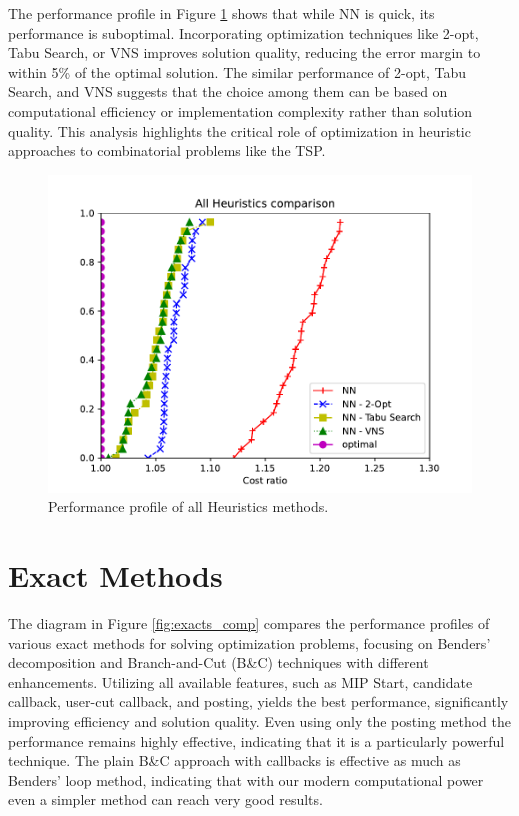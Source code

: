 The performance profile in Figure \ref{fig:heur_comp} shows that while NN is quick, its performance is suboptimal. Incorporating optimization techniques like 2-opt, Tabu Search, or VNS improves solution quality, reducing the error margin to within 5\% of the optimal solution. The similar performance of 2-opt, Tabu Search, and VNS suggests that the choice among them can be based on computational efficiency or implementation complexity rather than solution quality. This analysis highlights the critical role of optimization in heuristic approaches to combinatorial problems like the TSP.

\begin{figure}[H]
    \centering
    \includegraphics[width=0.7\linewidth]{Immagini/All Heuristics.pdf}
    \caption{Performance profile of all Heuristics methods.}
    \label{fig:heur_comp}
\end{figure}

\section{Exact Methods}
The diagram in Figure \ref{fig:exacts_comp} compares the performance profiles of various exact methods for solving optimization problems, focusing on Benders' decomposition and Branch-and-Cut (B\&C) techniques with different enhancements. Utilizing all available features, such as MIP Start, candidate callback, user-cut callback, and posting, yields the best performance, significantly improving efficiency and solution quality. Even using only the posting method the performance remains highly effective, indicating that it is a particularly powerful technique. The plain B\&C approach with callbacks is effective as much as Benders' loop method, indicating that with our modern computational power even a simpler method can reach very good results.

